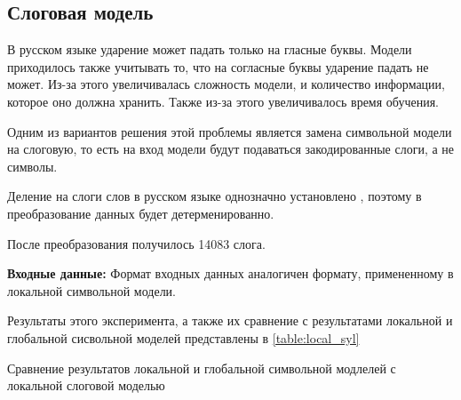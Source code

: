 \documentclass[14pt, a4paper, russian]{report}
\begin{document}
\begin{normalsize}
\subsection{Слоговая модель}
В русском языке ударение может падать только на гласные буквы. Модели приходилось также учитывать то, что на согласные буквы ударение падать не может. Из-за этого увеличивалась сложность модели, и количество информации, которое оно должна хранить. Также из-за этого увеличивалось время обучения.

Одним из вариантов решения этой проблемы является замена символьной модели на слоговую, то есть на вход модели будут подаваться закодированные слоги, а не символы.

Деление на слоги слов в русском языке однозначно установлено \cite{litnevskaya}, поэтому в преобразование данных будет детерменированно. 

После преобразования получилось 14083 слога.

\textbf{Входные данные:} Формат входных данных аналогичен формату, примененному в локальной символьной модели.

Результаты этого эксперимента, а также их сравнение с результатами локальной и глобальной сисвольной моделей представлены в \cref{table:local_syl}

\begin{table}[H]
		\caption{Сравнение результатов локальной и глобальной символьной модлелей с локальной слоговой моделью}
	

\end{table}
\end{normalsize}
\end{document}
